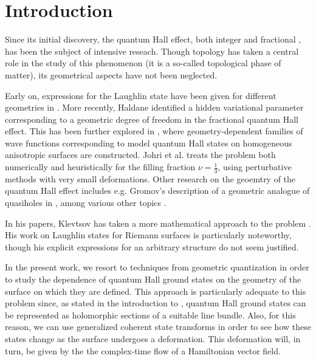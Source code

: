\documentclass[notas.tex]{subfiles} 				%
\begin{document}
\section{Introduction}

Since its initial discovery, the quantum Hall effect, both integer \cite{klitzing_new_1980} and fractional \cite{tsui_two-dimensional_1982}, has been the subject of intensive reseach. Though topology has taken a central role in the study of this phenomenon (it is a so-called topological phase of matter), its geometrical aspects have not been neglected. 

Early on, expressions for the Laughlin state \cite{laughlin_anomalous_1983} have been given for different geometries in \cite{azuma_explicit_1994, haldane_periodic_1985,haldane_fractional_1983}. More recently, Haldane identified a hidden variational parameter corresponding to a geometric degree of freedom \cite{haldane_geometrical_2011} in the fractional quantum Hall effect. This has been further explored in \cite{qiu_model_2012}, where geometry-dependent families of wave functions corresponding to model quantum Hall states on homogeneous anisotropic surfaces are constructed. Johri et al. \cite{johri_probing_2016} treats the problem both numerically and heuristically for the filling fraction $\nu = \frac{1}{3}$, using perturbative methods with very small deformations. Other research on the geoemtry of the quantum Hall effect includes e.g. Gromov's description of a geometric analogue of quasiholes in \cite{gromov_geometric_2016}, among various other topics \cite{ferrari_fqhe_2014, gromov_investigating_2017, gromov_bimetric_2017, liu_geometric_2018, yang_three-body_2018}. 

In his papers, Klevtsov has taken a more mathematical approach to the problem \cite{klevtsov_laughlin_2017, klevtsov_quantum_2017, klevtsov_laughlin_2019}. His work on Laughlin states for Riemann surfaces \cite{klevtsov_laughlin_2019} is particularly noteworthy, though his explicit expressions for an arbitrary structure do not seem justified. 

In the present work, we resort to techniques from geometric quantization in order to study the dependence of quantum Hall ground states on the geometry of the surface on which they are defined. This approach is particularly adequate to this problem since, as stated in the introduction to , quantum Hall ground states can be represented as holomorphic sections of a suitable line bundle. Also, for this reason, we can use generalized coherent state transforms in order to see how these states change as the surface undergoes a deformation. This deformation will, in turn, be given by the  the complex-time flow of a Hamiltonian vector field.
\end{document}
